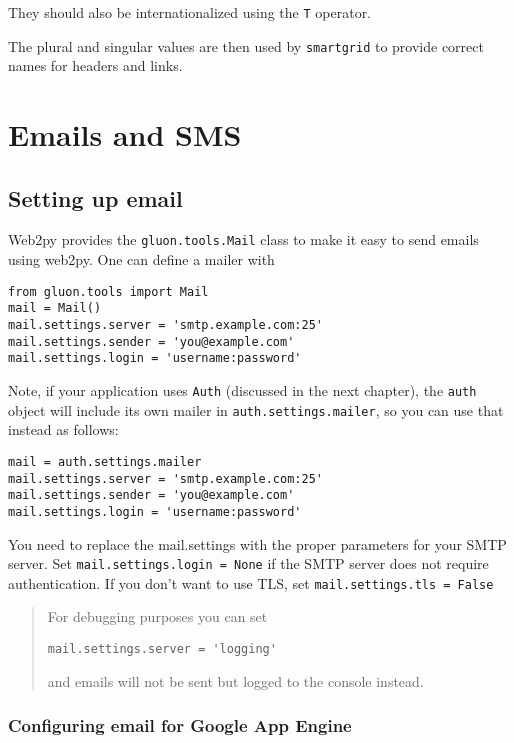 \documentclass[justified,sixbynine,notoc]{tufte-book}
\def\ft{\small\tt}
\def\inxx#1{\index{#1}}
\begin{document}
\begin{fullwidth}
They should also be internationalized using the {\ft T} operator.

The plural and singular values are then used by {\ft smartgrid}
to provide correct names for headers and links.

\goodbreak\chapter{Emails and SMS}

\inxx{Mail}

\goodbreak\section{Setting up email}

Web2py provides the {\ft gluon.tools.Mail} class to make it easy to send emails using web2py. One can define a mailer with
\begin{lstlisting}
from gluon.tools import Mail
mail = Mail()
mail.settings.server = 'smtp.example.com:25'
mail.settings.sender = 'you@example.com'
mail.settings.login = 'username:password'
\end{lstlisting}

Note, if your application uses {\ft Auth} (discussed in the next chapter), the {\ft auth} object will include its own mailer in {\ft auth.settings.mailer}, so you can use that instead as follows:
\begin{lstlisting}
mail = auth.settings.mailer
mail.settings.server = 'smtp.example.com:25'
mail.settings.sender = 'you@example.com'
mail.settings.login = 'username:password'
\end{lstlisting}

You need to replace the mail.settings with the proper parameters for your SMTP server. Set {\ft mail.settings.login = None} if the SMTP server does not require authentication.
If you don't want to use TLS, set {\ft mail.settings.tls = False}

\inxx{email logging}

\begin{quote}For debugging purposes you can set
\begin{lstlisting}
mail.settings.server = 'logging'
\end{lstlisting}
and emails will not be sent but logged to the console instead.\end{quote}
\goodbreak\subsection{Configuring email for Google App Engine}


\end{fullwidth}
\end{document}
